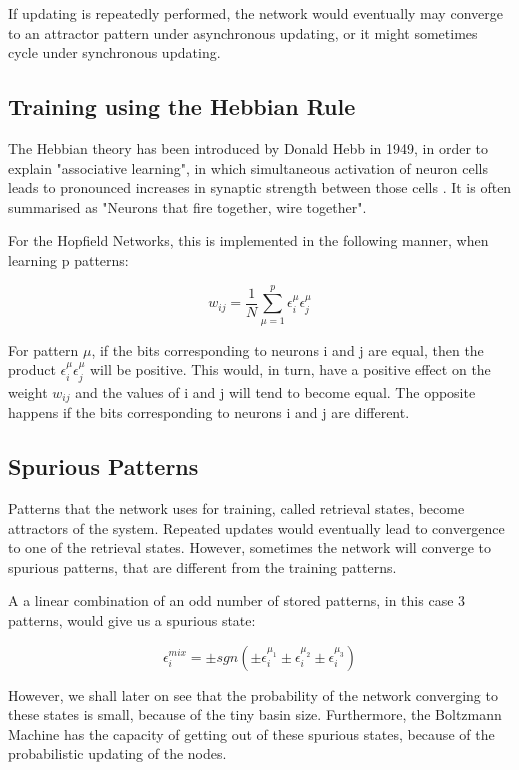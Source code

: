 If updating is repeatedly performed, the network would eventually may converge to an attractor pattern under asynchronous updating, or it might sometimes cycle under synchronous updating. 

\subsection{Training using the Hebbian Rule}

The Hebbian theory has been introduced by Donald Hebb in 1949, in order to explain "associative learning", in which simultaneous activation of neuron cells leads to pronounced increases in synaptic strength between those cells \cite{hebb_wiki}. It is often summarised as "Neurons that fire together, wire together".

For the Hopfield Networks, this is implemented in the following manner, when learning p patterns:

\[ w_{ij}=\frac{1}{N}\sum_{\mu=1}^{p}\epsilon_{i}^\mu \epsilon_{j}^\mu \]

For pattern \(\mu\), if the bits corresponding to neurons i and j are equal, then the product  \( \epsilon_{i}^\mu \epsilon_{j}^\mu \) will be positive. This would, in turn, have a positive effect on the weight \(w_{ij} \) and the values of i and j will tend to become equal. The opposite happens if the bits corresponding to neurons i and j are different.

\subsection{Spurious Patterns}

Patterns that the network uses for training, called retrieval states, become attractors of the system. Repeated updates would eventually lead to convergence to one of the retrieval states. However, sometimes the network will converge to spurious patterns, that are different from the training patterns. 

A a linear combination of an odd number of stored patterns, in this case 3 patterns, would give us a spurious state:

\[ \epsilon_{i}^{mix} = \pm sgn(\pm \epsilon_{i}^{\mu_{1}} 
			         \pm \epsilon_{i}^{\mu_{2}}
			         \pm \epsilon_{i}^{\mu_{3}}) \]

However, we shall later on see that the probability of the network converging to these states is small, because of the tiny basin size. Furthermore, the Boltzmann Machine has the capacity of getting out of these spurious states, because of the probabilistic updating of the nodes.

